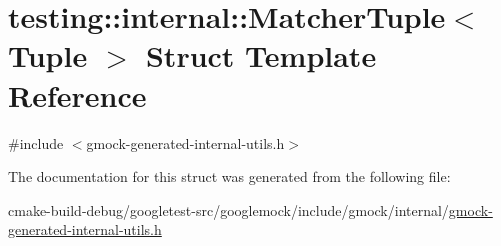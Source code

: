 \hypertarget{structtesting_1_1internal_1_1MatcherTuple}{}\section{testing\+::internal\+::Matcher\+Tuple$<$ Tuple $>$ Struct Template Reference}
\label{structtesting_1_1internal_1_1MatcherTuple}


{\ttfamily \#include $<$gmock-\/generated-\/internal-\/utils.\+h$>$}



The documentation for this struct was generated from the following file\+:\begin{DoxyCompactItemize}
\item 
cmake-\/build-\/debug/googletest-\/src/googlemock/include/gmock/internal/\mbox{\hyperlink{gmock-generated-internal-utils_8h}{gmock-\/generated-\/internal-\/utils.\+h}}\end{DoxyCompactItemize}

